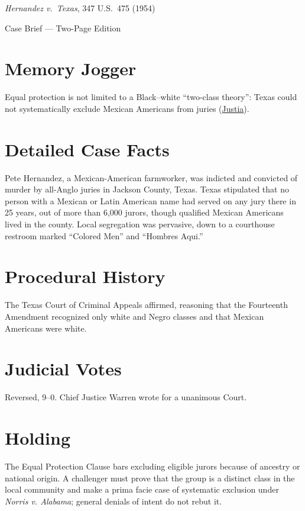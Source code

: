 \documentclass[12pt]{article}
\begin{document}
\begin{center}
{\LARGE \textit{Hernandez v.\ Texas}, 347 U.S.\ 475 (1954)\par}
\vspace{0.5em}
{\large Case Brief --- Two-Page Edition\par}
\end{center}

\section{Memory Jogger}
Equal protection is not limited to a Black--white ``two-class theory'': Texas could not systematically exclude Mexican Americans from juries (\href{https://supreme.justia.com/cases/federal/us/347/475/}{Justia}).

\section{Detailed Case Facts}
Pete Hernandez, a Mexican-American farmworker, was indicted and convicted of murder by all-Anglo juries in Jackson County, Texas. Texas stipulated that no person with a Mexican or Latin American name had served on any jury there in 25 years, out of more than 6,000 jurors, though qualified Mexican Americans lived in the county. Local segregation was pervasive, down to a courthouse restroom marked ``Colored Men'' and ``Hombres Aqui.''

\section{Procedural History}
The Texas Court of Criminal Appeals affirmed, reasoning that the Fourteenth Amendment recognized only white and Negro classes and that Mexican Americans were white.

\section{Judicial Votes}
Reversed, 9--0. Chief Justice Warren wrote for a unanimous Court.

\section{Holding}
The Equal Protection Clause bars excluding eligible jurors because of ancestry or national origin. A challenger must prove that the group is a distinct class in the local community and make a prima facie case of systematic exclusion under \textit{Norris v. Alabama}; general denials of intent do not rebut it.
\end{document}
